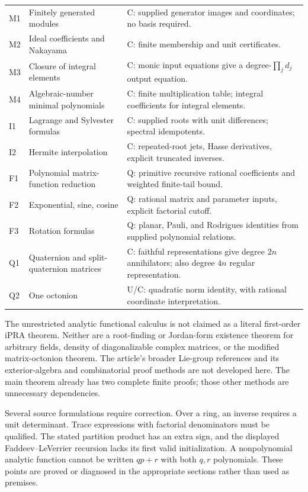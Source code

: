 \begin{longtable}{@{}p{}p{}p{}@{}}
M1 & Finitely generated modules & C: supplied generator images and coordinates; no basis required. \\
M2 & Ideal coefficients and Nakayama & C: finite membership and unit certificates. \\
M3 & Closure of integral elements & C: monic input equations give a degree-$\prod_jd_j$ output equation. \\
M4 & Algebraic-number minimal polynomials & C: finite multiplication table; integral coefficients for integral elements. \\
I1 & Lagrange and Sylvester formulas & C: supplied roots with unit differences; spectral idempotents. \\
I2 & Hermite interpolation & C: repeated-root jets, Hasse derivatives, explicit truncated inverses. \\
F1 & Polynomial matrix-function reduction & Q: primitive recursive rational coefficients and weighted finite-tail bound. \\
F2 & Exponential, sine, cosine & Q: rational matrix and parameter inputs, explicit factorial cutoff. \\
F3 & Rotation formulas & Q: planar, Pauli, and Rodrigues identities from supplied polynomial relations. \\
Q1 & Quaternion and split-quaternion matrices & C: faithful representations give degree $2n$ annihilators; also degree $4n$ regular representation. \\
Q2 & One octonion & U/C: quadratic norm identity, with rational coordinate interpretation. \\
\end{longtable}
\normalsize

The unrestricted analytic functional calculus is not claimed as a literal
first-order iPRA theorem. Neither are a root-finding or Jordan-form
existence theorem for arbitrary fields, density of diagonalizable complex
matrices, or the modified matrix-octonion theorem. The article's broader
Lie-group references and its exterior-algebra and combinatorial proof
methods are not developed here. The main theorem already has two
complete finite proofs; those other methods are unnecessary dependencies.

Several source formulations require correction. Over a ring, an inverse
requires a unit determinant. Trace expressions with factorial
denominators must be qualified. The stated partition product has an
extra sign, and the displayed Faddeev--LeVerrier recursion lacks its
first valid initialization. A nonpolynomial analytic function cannot be
written $qp+r$ with both $q,r$ polynomials. These points are proved or
diagnosed in the appropriate sections rather than used as premises.

